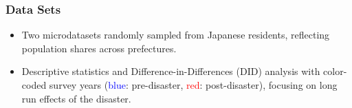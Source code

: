 \documentclass[serif, aspectratio=169]{beamer}
\begin{document}
\begin{frame}[label=data]
\frametitle{Data Sets}








\begin{itemize}
    \item Two microdatasets randomly sampled from Japanese residents, reflecting population shares across prefectures.
    \item Descriptive statistics and Difference-in-Differences (DID) analysis with color-coded survey years (\textcolor{blue}{blue}: pre-disaster, \textcolor{red}{red}: post-disaster), focusing on long run effects of the disaster.
\end{itemize}


\end{frame}
\end{document}
